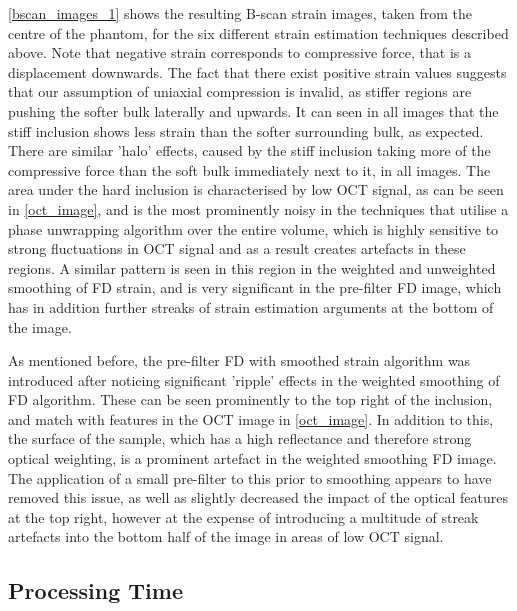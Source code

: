 \autoref{bscan_images_1} shows the resulting B-scan strain images, taken from the centre of the phantom, for the six different strain estimation techniques described above. Note that negative strain corresponds to compressive force, that is a displacement downwards. The fact that there exist positive strain values suggests that our assumption of uniaxial compression is invalid, as stiffer regions are pushing the softer bulk laterally and upwards. It can seen in all images that the stiff inclusion shows less strain than the softer surrounding bulk, as expected. There are similar 'halo' effects, caused by the stiff inclusion taking more of the compressive force than the soft bulk immediately next to it, in all images. The area under the hard inclusion is characterised by low OCT signal, as can be seen in \autoref{oct_image}, and is the most prominently noisy in the techniques that utilise a phase unwrapping algorithm over the entire volume, which is highly sensitive to strong fluctuations in OCT signal and as a result creates artefacts in these regions. A similar pattern is seen in this region in the weighted and unweighted smoothing of FD strain, and is very significant in the pre-filter FD image, which has in addition further streaks of strain estimation arguments at the bottom of the image. 

As mentioned before, the pre-filter FD with smoothed strain algorithm was introduced after noticing significant 'ripple' effects in the weighted smoothing of FD algorithm. These can be seen prominently to the top right of the inclusion, and match with features in the OCT image in \autoref{oct_image}. In addition to this, the surface of the sample, which has a high reflectance and therefore strong optical weighting, is a  prominent artefact in the weighted smoothing FD image. The application of a small pre-filter to this prior to smoothing appears to have removed this issue, as well as slightly decreased the impact of the optical features at the top right, however at the expense of introducing a multitude of streak artefacts into the bottom half of the image in areas of low OCT signal.

\subsection{Processing Time}


